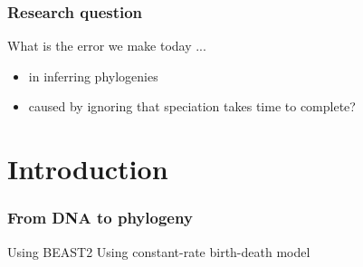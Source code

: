 \documentclass{beamer}
\begin{document}
\begin{frame}
  \frametitle{Research question}

  What is the error we make today ...

  \begin{itemize}
    \item in inferring phylogenies
    \item caused by ignoring that speciation takes time to complete?
  \end{itemize}

\end{frame}

\section[Introduction]{Introduction}

\begin{frame}
  \frametitle{From DNA to phylogeny}

  Using BEAST2\footnotemark
  Using constant-rate birth-death model\footnotemark



\end{frame}
\end{document}
